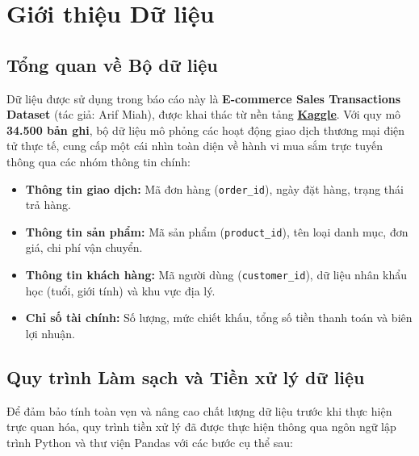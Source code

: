 \section{Giới thiệu Dữ liệu}

\subsection{Tổng quan về Bộ dữ liệu}

Dữ liệu được sử dụng trong báo cáo này là \textbf{E-commerce Sales Transactions Dataset} (tác giả: Arif Miah), được khai thác từ nền tảng \href{https://www.kaggle.com/datasets/miadul/e-commerce-sales-transactions-dataset}{\textbf{Kaggle}}. Với quy mô \textbf{34.500 bản ghi}, bộ dữ liệu mô phỏng các hoạt động giao dịch thương mại điện tử thực tế, cung cấp một cái nhìn toàn diện về hành vi mua sắm trực tuyến thông qua các nhóm thông tin chính:

\begin{itemize}
    \item \textbf{Thông tin giao dịch:} Mã đơn hàng (\texttt{order\_id}), ngày đặt hàng, trạng thái trả hàng.
    \item \textbf{Thông tin sản phẩm:} Mã sản phẩm (\texttt{product\_id}), tên loại danh mục, đơn giá, chi phí vận chuyển.
    \item \textbf{Thông tin khách hàng:} Mã người dùng (\texttt{customer\_id}), dữ liệu nhân khẩu học (tuổi, giới tính) và khu vực địa lý.
    \item \textbf{Chỉ số tài chính:} Số lượng, mức chiết khấu, tổng số tiền thanh toán và biên lợi nhuận.
\end{itemize}


\subsection{Quy trình Làm sạch và Tiền xử lý dữ liệu}

Để đảm bảo tính toàn vẹn và nâng cao chất lượng dữ liệu trước khi thực hiện trực quan hóa, quy trình tiền xử lý đã được thực hiện thông qua ngôn ngữ lập trình Python và thư viện Pandas với các bước cụ thể sau:

